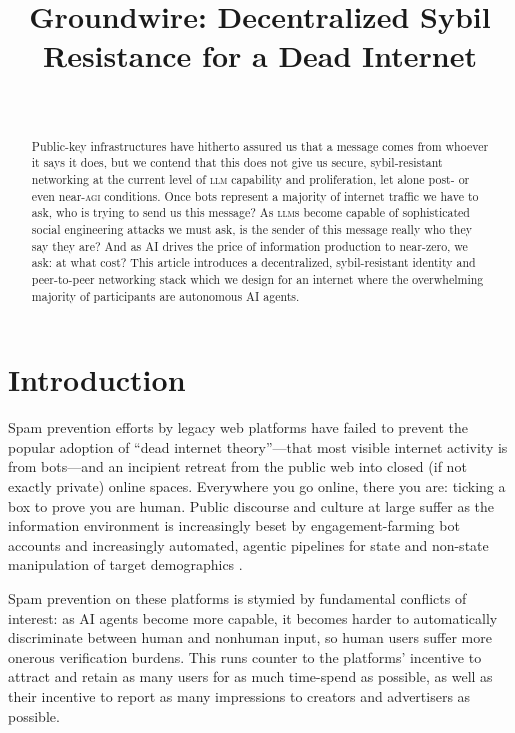 \documentclass[twoside]{article}
\title{Groundwire: Decentralized Sybil Resistance for a Dead Internet}
\author{\authorname \\ \affiliation}
\date{}
\begin{document}
\maketitle
\thispagestyle{firststyle}

\begin{abstract}
\sloppy
Public-key infrastructures have hitherto assured us that a message comes
from whoever it says it does, but we contend that this does not give us
secure, sybil-resistant networking at the current level of \textsc{llm}
capability and proliferation, let alone post- or even near-\textsc{agi}
conditions. Once bots represent a majority of internet traffic we have
to ask, who is trying to send us this message? As \textsc{llm}s become capable of
sophisticated social engineering attacks we must ask, is the sender of
this message really who they say they are? And as AI drives the price of
information production to near-zero, we ask: at what cost? This article
introduces a decentralized, sybil-resistant identity and peer-to-peer
networking stack which we design for an internet where the overwhelming
majority of participants are autonomous AI agents.
\end{abstract}

\setcounter{page}{1}

\tableofcontents

\section{Introduction}\label{introduction}

Spam prevention efforts by legacy web platforms have failed to prevent the popular adoption of ``dead internet theory''---that most visible
internet activity is from bots---and an incipient retreat from the
public web into closed (if not exactly private) online spaces.
Everywhere you go online, there you are: ticking a box to prove you are
human. Public discourse and culture at large suffer as the information
environment is increasingly beset by engagement-farming bot accounts
and increasingly automated, agentic pipelines for state and
non-state manipulation of target demographics \citep{Lumbaca2025}.

Spam prevention on these platforms is stymied by fundamental conflicts
of interest: as AI agents become more capable, it becomes harder to
automatically discriminate between human and nonhuman input, so human
users suffer more onerous verification burdens. This runs counter to the
platforms' incentive to attract and retain as many users for as much
time-spend as possible, as well as their incentive to report as many
impressions to creators and advertisers as possible.
\end{document}
